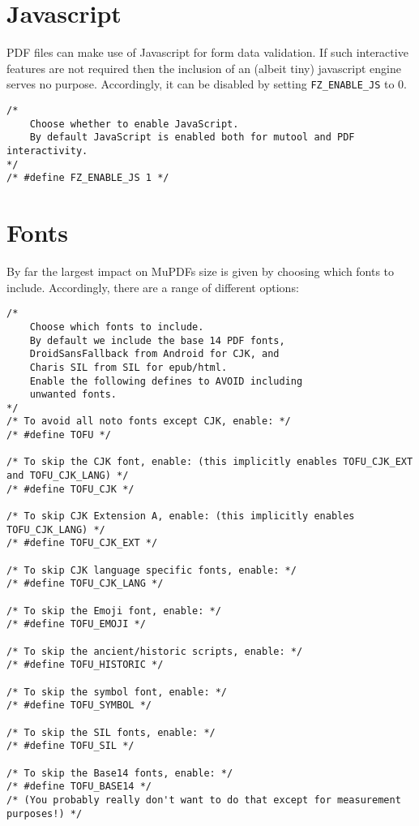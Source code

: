 \documentclass[oneside]{book}
\begin{document}
\section{Javascript}

PDF files can make use of Javascript for form data validation. If such interactive features are not required then the inclusion of an (albeit tiny) javascript engine serves no purpose. Accordingly, it can be disabled by setting \texttt{FZ\_ENABLE\_JS} to 0.

\begin{lstlisting}
/*
	Choose whether to enable JavaScript.
	By default JavaScript is enabled both for mutool and PDF interactivity.
*/
/* #define FZ_ENABLE_JS 1 */
\end{lstlisting}

\section{Fonts}

By far the largest impact on MuPDFs size is given by choosing which fonts to include. Accordingly, there are a range of different options:

\begin{lstlisting}
/*
	Choose which fonts to include.
	By default we include the base 14 PDF fonts,
	DroidSansFallback from Android for CJK, and
	Charis SIL from SIL for epub/html.
	Enable the following defines to AVOID including
	unwanted fonts.
*/
/* To avoid all noto fonts except CJK, enable: */
/* #define TOFU */

/* To skip the CJK font, enable: (this implicitly enables TOFU_CJK_EXT and TOFU_CJK_LANG) */
/* #define TOFU_CJK */

/* To skip CJK Extension A, enable: (this implicitly enables TOFU_CJK_LANG) */
/* #define TOFU_CJK_EXT */

/* To skip CJK language specific fonts, enable: */
/* #define TOFU_CJK_LANG */

/* To skip the Emoji font, enable: */
/* #define TOFU_EMOJI */

/* To skip the ancient/historic scripts, enable: */
/* #define TOFU_HISTORIC */

/* To skip the symbol font, enable: */
/* #define TOFU_SYMBOL */

/* To skip the SIL fonts, enable: */
/* #define TOFU_SIL */

/* To skip the Base14 fonts, enable: */
/* #define TOFU_BASE14 */
/* (You probably really don't want to do that except for measurement purposes!) */
\end{lstlisting}
\end{document}
